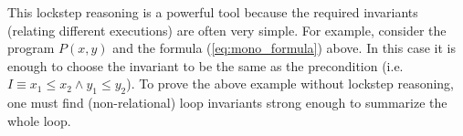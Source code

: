 

This lockstep reasoning is a powerful tool because the required invariants (relating
different executions) are often very simple. For example, consider the
program $P(x,y)$ and the formula (\ref{eq:mono_formula}) above.
In this case it is enough to choose the invariant to be the same as the precondition (i.e. $I \equiv x_1 \leq x_2 \land y_1 \leq y_2$).
To prove the above example without lockstep reasoning, one must find (non-relational) loop invariants
strong enough to summarize the whole loop.

